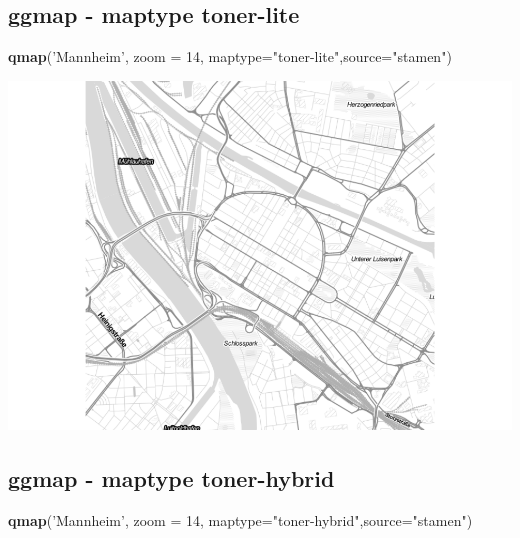 \documentclass[]{article}
\newenvironment{Shaded}{\begin{snugshade}}{\end{snugshade}}
\newcommand{\KeywordTok}[1]{\textcolor[rgb]{0.13,0.29,0.53}{\textbf{{#1}}}}
\newcommand{\DataTypeTok}[1]{\textcolor[rgb]{0.13,0.29,0.53}{{#1}}}
\newcommand{\DecValTok}[1]{\textcolor[rgb]{0.00,0.00,0.81}{{#1}}}
\newcommand{\StringTok}[1]{\textcolor[rgb]{0.31,0.60,0.02}{{#1}}}
\newcommand{\NormalTok}[1]{{#1}}
\begin{document}
\subsection{ggmap - maptype
toner-lite}\label{ggmap---maptype-toner-lite}

\begin{Shaded}
\begin{Highlighting}[]
\KeywordTok{qmap}\NormalTok{(}\StringTok{'Mannheim'}\NormalTok{, }\DataTypeTok{zoom =} \DecValTok{14}\NormalTok{,}
 \DataTypeTok{maptype=}\StringTok{"toner-lite"}\NormalTok{,}\DataTypeTok{source=}\StringTok{"stamen"}\NormalTok{)}
\end{Highlighting}
\end{Shaded}

\includegraphics{Intro_Datenanalyse1_files/figure-latex/unnamed-chunk-254-1.pdf}

\subsection{ggmap - maptype
toner-hybrid}\label{ggmap---maptype-toner-hybrid}

\begin{Shaded}
\begin{Highlighting}[]
\KeywordTok{qmap}\NormalTok{(}\StringTok{'Mannheim'}\NormalTok{, }\DataTypeTok{zoom =} \DecValTok{14}\NormalTok{,}
 \DataTypeTok{maptype=}\StringTok{"toner-hybrid"}\NormalTok{,}\DataTypeTok{source=}\StringTok{"stamen"}\NormalTok{)}
\end{Highlighting}
\end{Shaded}
\end{document}

